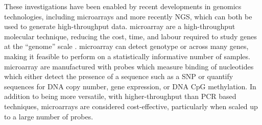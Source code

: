 These investigations have been enabled by recent developments in \glspl{genomic} technologies, including \glspl{microarray} and more recently \gls{NGS}, which can both be used to generate high-throughput  data. \Gls{microarray} are a high-throughput molecular technique, reducing the cost, time, and labour required to study genes at the ``genome'' scale \citep{Schena1996}. \Gls{microarray} can detect genotype or  across many genes, making it feasible to perform on a statistically informative number of samples. \Gls{microarray} are manufactured with probes which measure binding of nucleotides which either detect the presence of a sequence such as a \gls{SNP} or quantify sequences for \acrshort{DNA} copy number, \gls{gene expression}, or \acrshort{DNA} \gls{CpG} methylation. %
In addition to being more versatile, with higher-throughput than \gls{PCR} based techniques, \glspl{microarray} are considered cost-effective, particularly when scaled up to a large number of probes.


